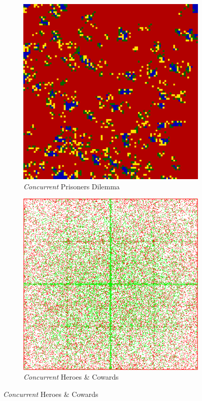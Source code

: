 \begin{figure}
    \begin{subfigure}[b]{0.4\textwidth}
		\centering
       	\includegraphics[width=.7\textwidth, angle=0]{./fig/con_99x99_436steps_MSG_haskell.png}
        \caption{\textit{Concurrent} Prisoners Dilemma}
        \label{fig:pd_con}
    \end{subfigure}
    \begin{subfigure}[b]{0.4\textwidth}
    	\centering
        \includegraphics[width=.7\textwidth, angle=0]{./fig/con_HAC_100_000_500steps_java.png}
        \caption{\textit{Concurrent} Heroes \& Cowards}
        \label{fig:hac_con}
    \end{subfigure}



\end{figure}
